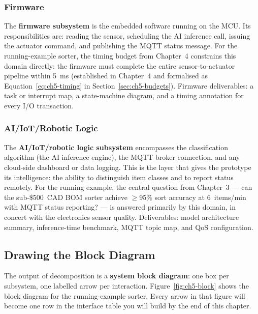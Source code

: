 \subsubsection{Firmware}
\label{subsubsec:ch5-firmware}

The \textbf{firmware subsystem} is the embedded software running on the MCU.
Its responsibilities are: reading the sensor, scheduling the AI inference call, issuing the actuator command, and publishing the MQTT status message.
For the running-example sorter, the timing budget from Chapter~4 constrains this domain directly: the firmware must complete the entire sensor-to-actuator pipeline within 5~ms (established in Chapter~4 and formalised as Equation~\ref{eq:ch5-timing} in Section~\ref{sec:ch5-budgets}).
Firmware deliverables: a task or interrupt map, a state-machine diagram, and a timing annotation for every I/O transaction.

\subsubsection{AI/IoT/Robotic Logic}
\label{subsubsec:ch5-aiiot}

The \textbf{AI/IoT/robotic logic subsystem} encompasses the classification algorithm (the AI inference engine), the MQTT broker connection, and any cloud-side dashboard or data logging.
This is the layer that gives the prototype its intelligence: the ability to distinguish item classes and to report status remotely.
For the running example, the central question from Chapter~3 --- can the sub-\$500~CAD BOM sorter achieve $\geq$95\% sort accuracy at 6~items/min with MQTT status reporting? --- is answered primarily by this domain, in concert with the electronics sensor quality.
Deliverables: model architecture summary, inference-time benchmark, MQTT topic map, and QoS configuration.

\subsection{Drawing the Block Diagram}
\label{subsec:ch5-block-diagram}

The output of decomposition is a \textbf{system block diagram}: one box per subsystem, one labelled arrow per interaction.
Figure~\ref{fig:ch5-block} shows the block diagram for the running-example sorter.
Every arrow in that figure will become one row in the interface table you will build by the end of this chapter.

